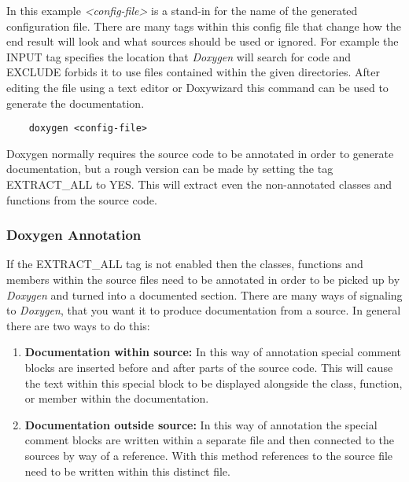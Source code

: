 In this example \textit{<config-file>} is a stand-in for the name of the generated configuration file. There are many tags within this config file that change how 
the end result will look and what sources should be used or ignored. For example the INPUT tag specifies the location that \textit{Doxygen} will search for code and
EXCLUDE forbids it to use files contained within the given directories. After editing the file using a text editor or Doxywizard this command can be used to generate 
the documentation.

\begin{verbatim}
    doxygen <config-file>
\end{verbatim}

Doxygen normally requires the source code to be annotated in order to generate documentation, but a rough version can be made by setting the tag EXTRACT\_ALL to YES.
This will extract even the non-annotated classes and functions from the source code.

\subsubsection{Doxygen Annotation}

If the EXTRACT\_ALL tag is not enabled then the classes, functions and members within the source files need to be annotated in order to be picked up by \textit{Doxygen}
and turned into a documented section. There are many ways of signaling to \textit{Doxygen}, that you want it to produce documentation from a source. In general there
are two ways to do this:
\begin{enumerate}
    \item \textbf{Documentation within source:} In this way of annotation special comment blocks are inserted before and after parts of the source code. 
                This will cause the text within this special block to be displayed alongside the class, function, or member within the documentation.
    \item \textbf{Documentation outside source:} In this way of annotation the special comment blocks are written within a separate file and then connected 
                to the sources by way of a reference. With this method references to the source file need to be written within this distinct file.
\end{enumerate}

